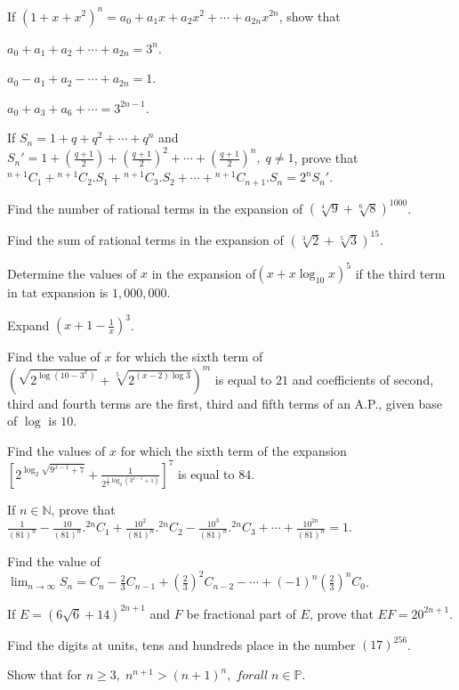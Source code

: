 \noindent If $(1 + x + x^2)^n = a_0 + a_1x + a_2x^2 + \cdots + a_{2n}x^{2n}$, show that

\item $a_0 + a_1 + a_2 + \cdots + a_{2n} = 3^n$.
\item $a_0 - a_1 + a_2 - \cdots + a_{2n} = 1$.
\item $a_0 + a_3 + a_6 + \cdots = 3^{2n - 1}$.
\item If $S_n = 1 + q + q^2 + \cdots + q^n$ and $S_n' = 1 + \left(\frac{q + 1}{2}\right) + \left(\frac{q + 1}{2}\right)^2 + \cdots
  + \left(\frac{q + 1}{2}\right)^n,\;q\neq 1$, prove that ${}^{n + 1}C_1 + {}^{n + 1}C_2.S_1 + {}^{n + 1}C_3.S_2 + \cdots + {}^{n +
    1}C_{n + 1}.S_n = 2^nS_n'$.
\item Find the number of rational terms in the expansion of $(\sqrt[4]{9} + \sqrt[6]{8})^{1000}$.
\item Find the sum of rational terms in the expansion of $(\sqrt[3]{2} + \sqrt[5]{3})^{15}$.
\item Determine the values of $x$ in the expansion of$(x + x\log_{10}x)^5$ if the third term in tat expansion is $1,000,000$.
\item Expand $\left(x + 1 - \frac{1}{x}\right)^3$.
\item Find the value of $x$ for which the sixth term of $\left(\sqrt{2^{\log(10 - 3^x)}} + \sqrt[5]{2^{(x - 2)\log3}}\right)^m$ is
  equal to $21$ and coefficients of second, third and fourth terms are the first, third and fifth terms of an A.P., given base of
  $\log$ is $10$.
\item Find the values of $x$ for which the sixth term of the expansion $\left[2^{\log_2\sqrt{9^{x - 1} + 7}} +
  \frac{1}{2^{\tfrac{1}{5}\log_2(3^{x -1} + 1)}}\right]^7$ is equal to $84$.
\item If $n\in\mathbb{N}$, prove that $\frac{1}{(81)^n} - \frac{10}{(81)^n}.{}^{2n}C_1 + \frac{10^2}{(81)^n}.{}^{2n}C_2 -
  \frac{10^3}{(81)^n}.{}^{2n}C_3 + \cdots + \frac{10^{2n}}{(81)^n} = 1$.
\item Find the value of $\displaystyle\lim_{n\to\infty}S_n = C_n - \frac{2}{3}C_{n- 1} + \left(\frac{2}{3}\right)^2C_{n - 2} -
  \cdots + (-1)^n\left(\frac{2}{3}\right)^nC_0$.
\item If $E = (6\sqrt{6} + 14)^{2n + 1}$ and $F$ be fractional part of $E$, prove that $EF= 20^{2n + 1}$.
\item Find the digits at units, tens and hundreds place in the number $(17)^{256}$.
\item Show that for $n\geq 3,\;n^{n + 1} > (n + 1)^n,\;forall\;n\in\mathbb{P}$.
